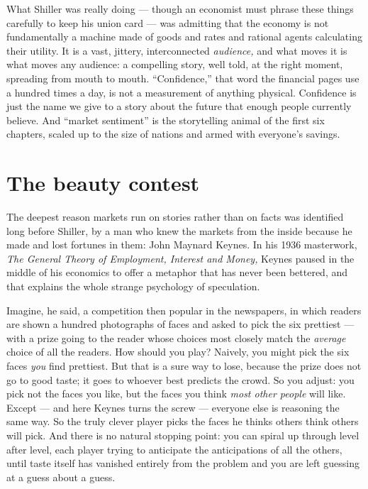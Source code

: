 What Shiller was really doing — though an economist must phrase these things carefully to keep his union card — was admitting that the economy is not fundamentally a machine made of goods and rates and rational agents calculating their utility. It is a vast, jittery, interconnected \emph{audience,} and what moves it is what moves any audience: a compelling story, well told, at the right moment, spreading from mouth to mouth. ``Confidence,'' that word the financial pages use a hundred times a day, is not a measurement of anything physical. Confidence is just the name we give to a story about the future that enough people currently believe. And ``market sentiment'' is the storytelling animal of the first six chapters, scaled up to the size of nations and armed with everyone's savings.

\section*{The beauty contest}

The deepest reason markets run on stories rather than on facts was identified long before Shiller, by a man who knew the markets from the inside because he made and lost fortunes in them: John Maynard Keynes. In his 1936 masterwork, \emph{The General Theory of Employment, Interest and Money,} Keynes paused in the middle of his economics to offer a metaphor that has never been bettered, and that explains the whole strange psychology of speculation.

Imagine, he said, a competition then popular in the newspapers, in which readers are shown a hundred photographs of faces and asked to pick the six prettiest — with a prize going to the reader whose choices most closely match the \emph{average} choice of all the readers. How should you play? Naively, you might pick the six faces \emph{you} find prettiest. But that is a sure way to lose, because the prize does not go to good taste; it goes to whoever best predicts the crowd. So you adjust: you pick not the faces you like, but the faces you think \emph{most other people} will like. Except — and here Keynes turns the screw — everyone else is reasoning the same way. So the truly clever player picks the faces he thinks others think others will pick. And there is no natural stopping point: you can spiral up through level after level, each player trying to anticipate the anticipations of all the others, until taste itself has vanished entirely from the problem and you are left guessing at a guess about a guess.

